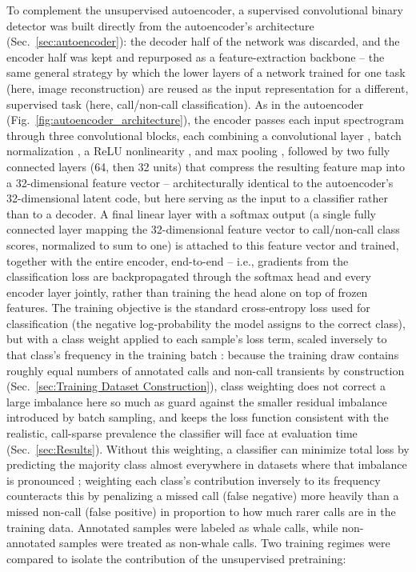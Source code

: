 \documentclass[preprint,NumberedRefs]{JASAnew}
\begin{document}
To complement the unsupervised autoencoder, a supervised convolutional binary
detector was built directly from the autoencoder's architecture
(Sec.~\ref{sec:autoencoder}): the decoder half of the network was discarded,
and the encoder half was kept and repurposed as a feature-extraction
backbone \cite{hinton2006reducing, yosinski2014transferable} -- the same
general strategy by which the lower layers of a network trained for one
task (here, image reconstruction) are reused as the input representation
for a different, supervised task (here, call/non-call classification). As
in the autoencoder (Fig.~\ref{fig:autoencoder_architecture}), the encoder
passes each input spectrogram through three convolutional blocks, each
combining a convolutional layer \cite{lecun1998gradient}, batch
normalization \cite{ioffe2015batch}, a ReLU nonlinearity
\cite{nair2010rectified}, and max pooling \cite{lecun1998gradient}, followed
by two fully connected layers (64, then 32 units) that compress the
resulting feature map into a 32-dimensional feature vector -- architecturally
identical to the autoencoder's 32-dimensional latent code, but here serving
as the input to a classifier rather than to a decoder. A final linear layer
with a softmax output (a single fully connected layer mapping the
32-dimensional feature vector to call/non-call class scores, normalized to
sum to one) is attached to this feature vector and trained, together with
the entire encoder, end-to-end -- i.e., gradients from the classification
loss are backpropagated through the softmax head and every encoder layer
jointly, rather than training the head alone on top of frozen features. The
training objective is the standard cross-entropy loss used for
classification (the negative log-probability the model assigns to the
correct class), but with a class weight applied to each sample's loss term,
scaled inversely to that class's frequency in the training batch
\cite{he2009learning}: because the training draw contains roughly equal
numbers of annotated calls and non-call transients by construction
(Sec.~\ref{sec:Training Dataset Construction}), class weighting does not
correct a large imbalance here so much as guard against the smaller
residual imbalance introduced by batch sampling, and keeps the loss
function consistent with the realistic, call-sparse prevalence the
classifier will face at evaluation time (Sec.~\ref{sec:Results}). Without
this weighting, a classifier can minimize total loss by predicting the
majority class almost everywhere in datasets where that imbalance is
pronounced \cite{he2009learning}; weighting each class's contribution
inversely to its frequency counteracts this by penalizing a missed call
(false negative) more heavily than a missed non-call (false positive) in
proportion to how much rarer calls are in the training data. Annotated
samples were labeled as whale calls, while non-annotated samples were
treated as non-whale calls. Two training regimes
were compared to isolate the contribution of the unsupervised pretraining:
\end{document}
